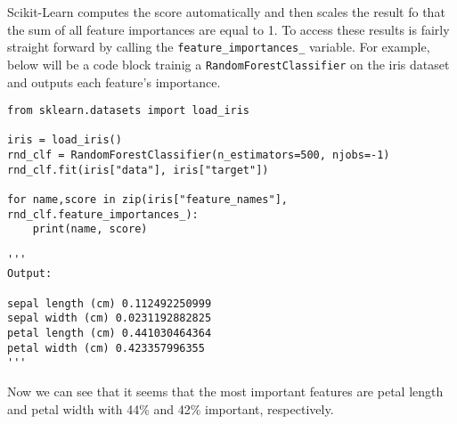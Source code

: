 \noindent
Scikit-Learn computes the score automatically and then scales the result fo that the sum of all feature importances are equal to 1. To 
access these results is fairly straight forward by calling the \texttt{feature_importances_} variable. For example, below 
will be a code block trainig a \texttt{RandomForestClassifier} on the iris dataset and outputs each feature's importance.\\

\begin{verbatim}
from sklearn.datasets import load_iris

iris = load_iris()
rnd_clf = RandomForestClassifier(n_estimators=500, njobs=-1)
rnd_clf.fit(iris["data"], iris["target"])

for name,score in zip(iris["feature_names"], rnd_clf.feature_importances_):
    print(name, score)

'''
Output:

sepal length (cm) 0.112492250999
sepal width (cm) 0.0231192882825
petal length (cm) 0.441030464364
petal width (cm) 0.423357996355
'''
\end{verbatim}

\noindent
Now we can see that it seems that the most important features are petal length and petal width with 44\% and 42\% important, respectively.









